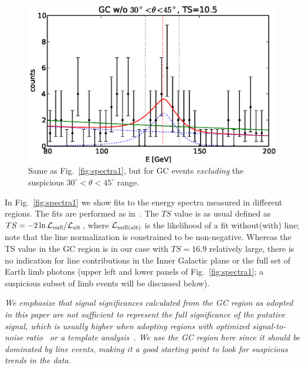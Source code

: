 \documentclass[aps,twocolumn,prd,superscriptaddress,showpacs,nofootinbib,fixfloat]{revtex4}
\begin{document}
\begin{figure}
  \centering
  \includegraphics[width=1.\linewidth]{plots/counts_GC_wo3045.eps}
  \caption{Same as Fig.~\ref{fig:spectra1}, but for GC
  events \emph{excluding} the suspicious
  $30^\circ<\theta<45^\circ$ range.}
  \label{fig:spectra2}
\end{figure}

In Fig.~\ref{fig:spectra1} we show fits to the energy
spectra measured in different regions. The fits are
performed as in~\cite{Weniger:2012}. The $TS$ value is as
usual defined as $TS=-2\ln \mathcal{L}_{\rm
null}/\mathcal{L}_{\rm alt}$, where $\mathcal{L}_{\rm
null(alt)}$ is the likelihood of a fit without(with) line;
note that the line normalization is constrained to be
non-negative. Whereas the TS value in the GC region is in
our case with $TS=16.9$ relatively large, there is no
indication for line contributions in the Inner Galactic
plane or the full set of Earth limb photons (upper left and
lower panels of Fig.~\ref{fig:spectra1}; a suspicious subset
of limb events will be discussed below).

\emph{We emphasize that signal significances calculated from the GC region as
adopted in this paper are not sufficient to represent the full significance of
the putative signal, which is usually higher when adopting regions with
optimized signal-to-noise ratio~\cite{Weniger:2012} or a template
analysis~\cite{linepaper}. We use the GC region here since it should be
dominated by line events, making it a good starting point to look for
suspicious trends in the data.}


\end{document}
